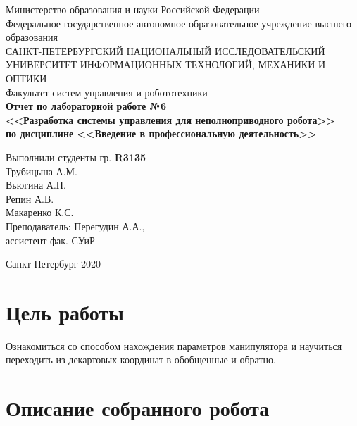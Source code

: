 \documentclass{article}
\begin{document}
	\pagestyle{empty}
	\begin{titlepage}
	\begin{center}
		\large{
		Министерство образования и науки Российской Федерации\\Федеральное государственное автономное образовательное учреждение высшего образования}\\
		\vspace*{3em plus 7em minus 6em}
		\Large
		САНКТ-ПЕТЕРБУРГСКИЙ НАЦИОНАЛЬНЫЙ ИССЛЕДОВАТЕЛЬСКИЙ \\УНИВЕРСИТЕТ ИНФОРМАЦИОННЫХ ТЕХНОЛОГИЙ, МЕХАНИКИ И ОПТИКИ\\
		\vspace*{3em plus 7em minus 6em}
		\Large
		Факультет систем управления и робототехники\\
		\vspace*{7em plus 7em minus 6em}
		\LARGE
		{\bf
		Отчет по лабораторной работе №6 \\ <<Разработка системы управления для неполноприводного робота>> \\по дисциплине <<Введение в профессиональную деятельность>>}\\
	\end{center}
	\begin{flushright}
		\Large
		\vspace*{10em plus 11em minus 9em}
		Выполнили студенты гр. {\textbf {R3135}}\\
		Трубицына А.М.\\
		Вьюгина А.П.\\
		Репин А.В.\\
		Макаренко К.С.\\
		Преподаватель: Перегудин А.А.,\\
		ассистент фак. СУиР		
	\end{flushright}
	\vspace*{15em plus 7em minus 6em}
	\begin{center}
		Санкт-Петербург 2020
	\end{center}
	\end{titlepage}


\section{Цель работы}
Ознакомиться со способом нахождения параметров манипулятора и научиться переходить из декартовых координат в обобщенные и обратно.

\section{Описание собранного робота}
\end{document}
